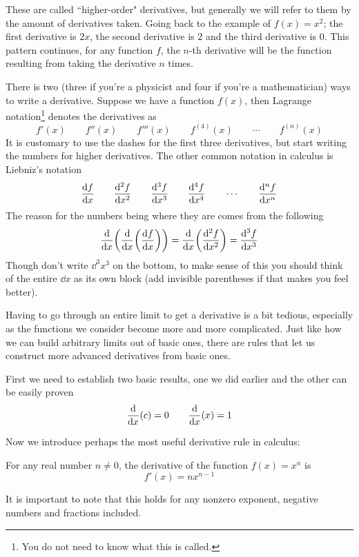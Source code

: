 These are called ``higher-order" derivatives, but generally we will refer to them by the amount of derivatives taken. Going back to the example of $f(x) = x^2$; the first derivative is $2x$, the second derivative is $2$ and the third derivative is $0$. This pattern continues, for any function $f$, the $n$-th derivative will be the function resulting from taking the derivative $n$ times.

There is two (three if you're a physicist and four if you're a mathematician) ways to write a derivative. Suppose we have a function $f(x)$, then Lagrange notation\footnote{You do not need to know what this is called.} denotes the derivatives as
\[ f'(x) \qquad f''(x) \qquad f'''(x) \qquad f^{(4)}(x) \qquad \cdots \qquad f^{(n)}(x)\]
It is customary to use the dashes for the first three derivatives, but start writing the numbers for higher derivatives. The other common notation in calculus is Liebniz's notation
\[ \dv{f}{x} \qquad \dv[2]{f}{x} \qquad \dv[3]{f}{x} \qquad \dv[4]{f}{x} \qquad \cdots \qquad \dv[n]{f}{x} \]
The reason for the numbers being where they are comes from the following
\[ \dv{x} \qty( \dv{x} \qty( \dv{f}{x} )) = \dv{x} \qty( \dv[2]{f}{x} ) = \dv[3]{f}{x} \]
Though don't write $\dd^3x^3$ on the bottom, to make sense of this you should think of the entire $\dd x$ as its own block (add invisible parentheses if that makes you feel better).

Having to go through an entire limit to get a derivative is a bit tedious, especially as the functions we consider become more and more complicated. Just like how we can build arbitrary limits out of basic ones, there are rules that let us construct more advanced derivatives from basic ones. 

\begin{example}
	First we need to establish two basic results, one we did earlier and the other can be easily proven
	\[ \dv{x}(c) = 0 \qquad \dv{x}(x) = 1 \] 
\end{example}

\newpage 
Now we introduce perhaps the most useful derivative rule in calculus:

\begin{theorem}
	For any real number $n \neq 0$, the derivative of the function $f(x) = x^n$ is 
	\[ f'(x) = n x^{n - 1} \]
\end{theorem}

It is important to note that this holds for any nonzero exponent, negative numbers and fractions included.

